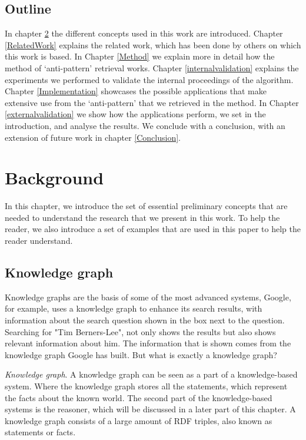 \documentclass[11pt,letterpaper ,oneside ]{book}
\begin{document}
\section{Outline}
In chapter \ref{Background} the different concepts used in this work are introduced. Chapter \ref{RelatedWork} explains the related work, which has been done by others on which this work is based.
In Chapter \ref{Method} we explain more in detail how the method of `anti-pattern' retrieval works. Chapter \ref{internalvalidation} explains the experiments we performed to validate the internal proceedings of the algorithm. Chapter \ref{Implementation} showcases the possible applications that make extensive use from the `anti-pattern' that we retrieved in the method. In Chapter \ref{externalvalidation} we show how the applications perform, we set in the introduction, and analyse the results. We conclude with a conclusion, with an extension of future work in chapter \ref{Conclusion}.
	
	
	\newpage
	\chapter{Background}\label{Background}
	In this chapter, we introduce the set of essential preliminary concepts that are needed to understand the research that we present in this work. To help the reader, we also introduce a set of examples that are used in this paper to help the reader understand.
	
	\section{Knowledge graph}\label{graphElements}
	Knowledge graphs are the basis of some of the most advanced systems, Google, for example, uses a knowledge graph to enhance its search results, with information about the search question shown in the box next to the question. Searching for "Tim Berners-Lee", not only shows the results but also shows relevant information about him. The information that is shown comes from the knowledge graph Google has built. But what is exactly a knowledge graph?
	
	\textit{Knowledge graph}. 
	A knowledge graph can be seen as a part of a knowledge-based system. Where the knowledge graph stores all the statements, which represent the facts about the known world. The second part of the knowledge-based systems is the reasoner, which will be discussed in a later part of this chapter. A knowledge graph consists of a large amount of RDF triples, also known as statements or facts.
	
\end{document}
